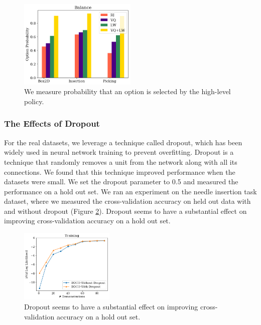 \begin{figure} [t]
\centering
    \includegraphics[width=0.5\textwidth]{ddco-experiments/exp8-3.png}
    \caption{We measure probability that an option is selected by the high-level policy. \label{fig:exp83}}
\end{figure}

\subsubsection{The Effects of Dropout}
For the real datasets, we leverage a technique called dropout, which has been widely used in neural network training to prevent overfitting.
Dropout is a technique that randomly removes a unit from
the network along with all its connections.
We found that this technique improved performance when the datasets were small. We set the dropout parameter to 0.5 and measured the performance on a hold out set.
We ran an experiment on the needle insertion task dataset, where we measured the cross-validation accuracy on held out data with and without dropout (Figure \ref{fig:exp9}).
Dropout seems to have a substantial effect on improving cross-validation accuracy on a hold out set.

\begin{figure} [ht!]
\centering
    \includegraphics[width=0.4\textwidth]{ddco-experiments/exp9.png}
    \caption{Dropout seems to have a substantial effect on improving cross-validation accuracy on a hold out set. \label{fig:exp9}}
\end{figure}

